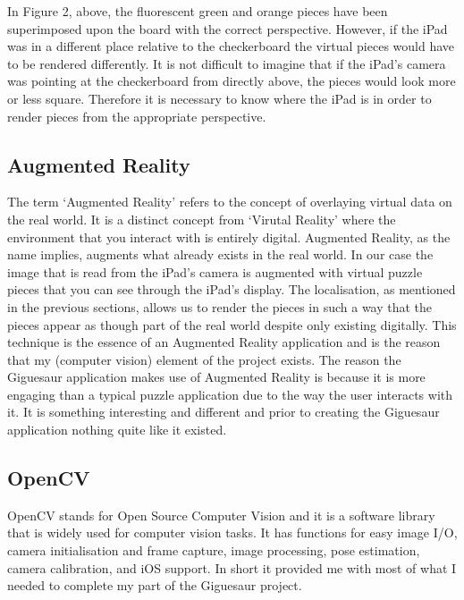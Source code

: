 \documentclass{article}
\begin{document}
In Figure 2, above, the fluorescent green and orange pieces have been superimposed upon the board with the correct perspective. However, if the iPad was in a different place relative to the checkerboard the virtual pieces would have to be rendered differently. It is not difficult to imagine that if the iPad's camera was pointing at the checkerboard from directly above, the pieces would look more or less square. Therefore it is necessary to know where the iPad is in order to render pieces from the appropriate perspective.

\subsection{Augmented Reality}
The term `Augmented Reality' refers to the concept of overlaying virtual data on the real world. It is a distinct concept from `Virutal Reality' where the environment that you interact with is entirely digital. Augmented Reality, as the name implies, augments what already exists in the real world. In our case the image that is read from the iPad's camera is augmented with virtual puzzle pieces that you can see through the iPad's display. The localisation, as mentioned in the previous sections, allows us to render the pieces in such a way that the pieces appear as though part of the real world despite only existing digitally. This technique is the essence of an Augmented Reality application and is the reason that my (computer vision) element of the project exists. The reason the Giguesaur application makes use of Augmented Reality is because it is more engaging than a typical puzzle application due to the way the user interacts with it. It is something interesting and different and prior to creating the Giguesaur application nothing quite like it existed. 


\subsection{OpenCV}

OpenCV stands for Open Source Computer Vision and it is a software library that is widely used for computer vision tasks. It has functions for easy image I/O, camera initialisation and frame capture, image processing, pose estimation, camera calibration, and iOS support. In short it provided me with most of what I needed to complete my part of the Giguesaur project.
\end{document}
